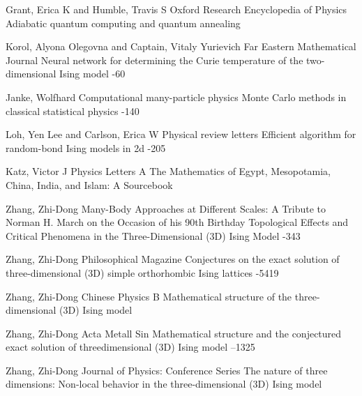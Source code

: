 \documentclass[10pt]{article}
\begin{document}
{\begin{thebibliography}{4}
			\by Grant, Erica K and Humble, Travis S
			\jour Oxford Research Encyclopedia of Physics
			\paper Adiabatic quantum computing and quantum annealing
			
			\by Korol, Alyona Olegovna and Captain, Vitaly Yurievich
			\jour Far Eastern Mathematical Journal
			\paper Neural network for determining the Curie temperature of the two-dimensional Ising model
			-60
			
			\by Janke, Wolfhard
			\jour Computational many-particle physics
			\paper Monte Carlo methods in classical statistical physics
			-140
			
			\by Loh, Yen Lee and Carlson, Erica W
			\jour Physical review letters
			\paper Efficient algorithm for random-bond Ising models in 2d
			-205
			
			\by Katz, Victor J
			\jour Physics Letters A
			\paper The Mathematics of Egypt, Mesopotamia, China, India, and Islam: A Sourcebook
			
			\by Zhang, Zhi-Dong
			\jour Many-Body Approaches at Different Scales: A Tribute to Norman H. March on the Occasion of his 90th Birthday
			\paper Topological Effects and Critical Phenomena in the Three-Dimensional (3D) Ising Model
			-343
			
			\by Zhang, Zhi-Dong
			\jour Philosophical Magazine
			\paper Conjectures on the exact solution of three-dimensional (3D) simple orthorhombic Ising lattices
			-5419
			
			\by Zhang, Zhi-Dong
			\jour Chinese Physics B
			\paper Mathematical structure of the three-dimensional (3D) Ising model
			
			\by Zhang, Zhi-Dong
			\jour Acta Metall Sin
			\paper Mathematical structure and the conjectured exact solution of threedimensional (3D) Ising model
			--1325
			
			\by Zhang, Zhi-Dong
			\jour Journal of Physics: Conference Series
			\paper The nature of three dimensions: Non-local behavior in the three-dimensional (3D) Ising model
			

\end{thebibliography}}
\end{document}
